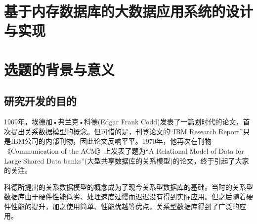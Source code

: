 \documentclass[proposal]{zjutreport}
\begin{document}



\frontmatter

\begingroup %
\let\clearpage\relax %

\titleformat{\chapter}[block]{\sihao\heiti\filcenter\bfseries}{\CJKnumber{\thechapter}}{1ex}{}{} %
\chapter*{基于内存数据库的大数据应用系统的设计与实现}
{} %

\mainmatter
\chapter{选题的背景与意义}
\section{研究开发的目的}
1969年，埃德加•弗兰克•科德(Edgar Frank Codd)发表了一篇划时代的论文，首次提出关系数据模型的概念。但可惜的是，刊登论文的“IBM Research Report”只是IBM公司的内部刊物，因此论文反响平平。1970年，他再次在刊物《Communication of the ACM》上发表了题为“A Relational Model of Data for Large Shared Data banks”(大型共享数据库的关系模型)的论文，终于引起了大家的关注。

科德所提出的关系数据模型的概念成为了现今关系型数据库的基础。当时的关系型数据库由于硬件性能低劣、处理速度过慢而迟迟没有得到实际应用。但之后随着硬件性能的提升，加之使用简单、性能优越等优点，关系型数据库得到了广泛的应用。
\end{document}
